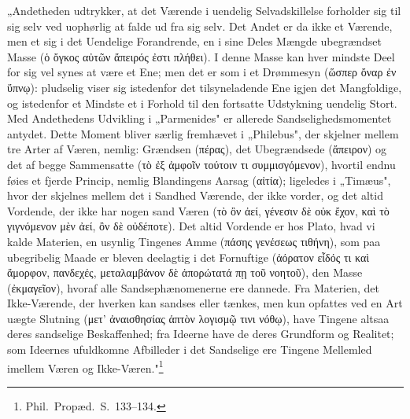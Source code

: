 \documentclass[12pt]{book}
\newcommand{\opage}[1]{\marginnote{\footnotesize\textit{[#1]}}}
\begin{document}
„Andetheden udtrykker, at det Værende i uendelig Selvadskillelse forholder sig til sig selv ved
uophørlig at falde ud fra sig selv. Det Andet er da ikke et Værende, men et sig i det Uendelige
Forandrende, en i sine Deles Mængde ubegrændset Masse (ὁ ὄγκος αὐτῶν ἄπειρός ἐστι πλήθει). I denne
Masse kan hver mindste Deel for sig vel synes at være et Ene; men det er som i et Drømmesyn
(ὥσπερ ὄναρ ἐν ὕπνῳ): pludselig viser sig istedenfor det tilsyneladende
\opage{183} Ene igjen det Mangfoldige, og istedenfor et Mindste et i Forhold til den fortsatte Udstykning
uendelig Stort. Med Andethedens Udvikling i „Parmenides" er allerede Sandselighedsmomentet
antydet. Dette Moment bliver særlig fremhævet i „Philebus", der skjelner mellem tre Arter af
Væren, nemlig: Grændsen (πέρας), det Ubegrændsede (ἄπειρον) og det af begge Sammensatte (τὸ ἐξ
ἀμφοῖν τούτοιν τι συμμισγόμενον), hvortil endnu føies et fjerde Princip, nemlig Blandingens
Aarsag (αἰτία); ligeledes i „Timæus", hvor der skjelnes mellem det i Sandhed Værende, der ikke
vorder, og det altid Vordende, der ikke har nogen sand Væren (τὸ ὂν ἀεί, γένεσιν δὲ οὐκ ἔχον, καὶ
τὸ γιγνόμενον μὲν ἀεί, ὂν δὲ οὐδέποτε). Det altid Vordende er hos Plato, hvad vi kalde Materien,
en usynlig Tingenes Amme (πάσης γενέσεως τιθήνη), som paa ubegribelig Maade er bleven deelagtig i
det Fornuftige (ἀόρατον εἶδός τι καὶ ἄμορφον, πανδεχές, μεταλαμβάνον δὲ ἀπορώτατά πῃ τοῦ νοητοῦ),
den Masse (ἐκμαγεῖον), hvoraf alle Sandsephænomenerne ere dannede. Fra Materien, det
Ikke-Værende, der hverken kan sandses eller tænkes, men kun opfattes ved en Art uægte Slutning
(μετ' ἀναισθησίας ἁπτὸν λογισμῷ τινι νόθῳ), have Tingene altsaa deres sandselige Beskaffenhed; fra
Ideerne have de deres Grundform og Realitet; som Ideernes ufuldkomne Afbilleder i det Sandselige
ere Tingene Mellemled imellem Væren og Ikke-Væren."\footnote{Phil.\ Propæd.\ S.~133--134.}
\end{document}
